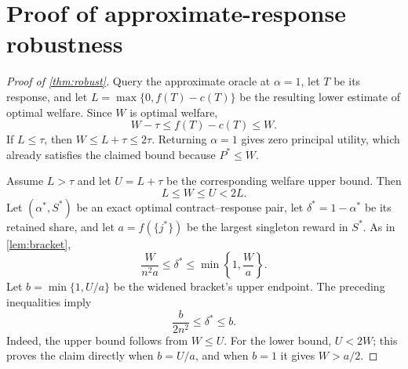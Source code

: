 \documentclass[11pt]{article}
\begin{document}
\clearpage
\appendix
\small

\section{Proof of approximate-response robustness}\label{app:robust}

\begin{proof}[Proof of \cref{thm:robust}]
Query the approximate oracle at $\alpha=1$, let $T$ be its response, and let
$L=\max\{0,f(T)-c(T)\}$ be the resulting lower estimate of optimal welfare.
Since $W$ is optimal welfare,
\[
                         W-\tau\leq f(T)-c(T)\leq W.
\]
If $L\leq\tau$, then $W\leq L+\tau\leq2\tau$.  Returning $\alpha=1$
gives zero principal utility, which already satisfies the claimed bound
because $P^*\leq W$.

Assume $L>\tau$ and let $U=L+\tau$ be the corresponding welfare upper bound.
Then
\[
                         L\leq W\leq U<2L.
\]
Let $(\alpha^*,S^*)$ be an exact optimal contract--response pair, let
$\delta^*=1-\alpha^*$ be its retained share, and let $a=f(\{j^*\})$ be the largest singleton
reward in $S^*$.  As in \cref{lem:bracket},
\[
                    \frac{W}{n^2a}\leq\delta^*
                    \leq\min\left\{1,\frac{W}{a}\right\}.
\]
Let $b=\min\{1,U/a\}$ be the widened bracket's upper endpoint.  The preceding
inequalities imply
\[
                         \frac{b}{2n^2}\leq\delta^*\leq b. \tag{10}
\]
Indeed, the upper bound follows from $W\leq U$.  For the lower bound,
$U<2W$; this proves the claim directly when $b=U/a$, and when $b=1$ it
gives $W>a/2$.


\end{proof}
\end{document}
